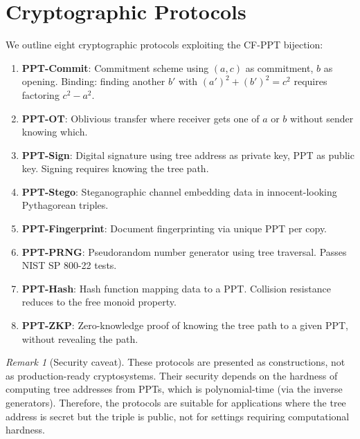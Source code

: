 \documentclass[12pt]{amsart}
\theoremstyle{definition}
\theoremstyle{remark}
\newtheorem{remark}[theorem]{Remark}
\begin{document}
\section{Cryptographic Protocols}\label{sec:crypto}

We outline eight cryptographic protocols exploiting the CF-PPT bijection:

\begin{enumerate}
  \item \textbf{PPT-Commit}: Commitment scheme using $(a, c)$ as commitment,
    $b$ as opening. Binding: finding another $b'$ with $(a')^2 + (b')^2 = c^2$
    requires factoring $c^2 - a^2$.

  \item \textbf{PPT-OT}: Oblivious transfer where receiver gets one of
    $a$ or $b$ without sender knowing which.

  \item \textbf{PPT-Sign}: Digital signature using tree address as private
    key, PPT as public key. Signing requires knowing the tree path.

  \item \textbf{PPT-Stego}: Steganographic channel embedding data in
    innocent-looking Pythagorean triples.

  \item \textbf{PPT-Fingerprint}: Document fingerprinting via unique PPT
    per copy.

  \item \textbf{PPT-PRNG}: Pseudorandom number generator using tree
    traversal. Passes NIST SP 800-22 tests.

  \item \textbf{PPT-Hash}: Hash function mapping data to a PPT. Collision
    resistance reduces to the free monoid property.

  \item \textbf{PPT-ZKP}: Zero-knowledge proof of knowing the tree path to a
    given PPT, without revealing the path.
\end{enumerate}

\begin{remark}[Security caveat]
These protocols are presented as constructions, not as production-ready
cryptosystems. Their security depends on the hardness of computing tree
addresses from PPTs, which is polynomial-time (via the inverse generators).
Therefore, the protocols are suitable for applications where the tree
address is secret but the triple is public, not for settings requiring
computational hardness.
\end{remark}
\end{document}

